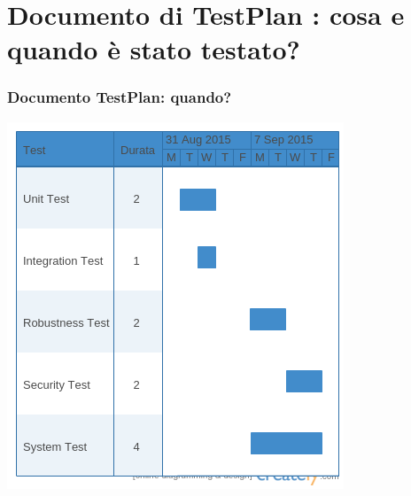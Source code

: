 \documentclass[a4paper,12pt]{beamer}
\begin{document}
\section{Documento di TestPlan : cosa e quando è stato testato?}
\begin{frame}
\frametitle{Documento TestPlan: quando?}
\includegraphics[trim={0 0.5cm 0 0}, clip, scale=0.5]{../TestPlan/test.png}
\end{frame}
\end{document}
